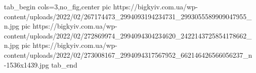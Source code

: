  
 
 
 
 


\ifcmt
  tab_begin cols=3,no_fig,center
     pic https://bigkyiv.com.ua/wp-content/uploads/2022/02/267174473_2994093194234731_2993055589909047955_n.jpg
		 pic https://bigkyiv.com.ua/wp-content/uploads/2022/02/272869974_2994094304234620_2422143725854178662_n.jpg
		 pic https://bigkyiv.com.ua/wp-content/uploads/2022/02/273008167_2994094317567952_662146426566056237_n-1536x1439.jpg
  tab_end
\fi
